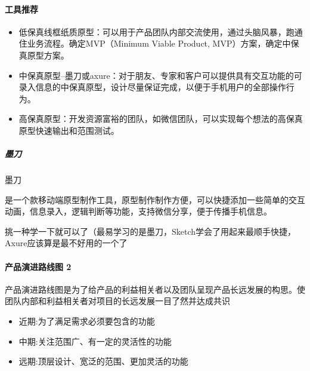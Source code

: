 \documentclass[letterpaper,10pt,english]{sphinxmanual}
\begin{document}
\paragraph{工具推荐}
\label{\detokenize{chapter_knowledge/prototype_design:id13}}\begin{itemize}
\item {} 
低保真\sphinxhyphen{}线框\sphinxhyphen{}纸质原型：可以用于产品团队内部交流使用，通过头脑风暴，跑通住业务流程。确定MVP（Minimum
Viable Product, MVP）方案，确定中保真原型方案。

\item {} 
中保真原型–墨刀或axure：对于朋友、专家和客户可以提供具有交互功能的可录入信息的中保真原型，设计尽量保证完成，以便于手机用户的全部操作行为。

\item {} 
高保真原型：开发资源富裕的团队，如微信团队，可以实现每个想法的高保真原型快速输出和范围测试。

\end{itemize}


\subparagraph{墨刀}
\label{\detokenize{chapter_knowledge/prototype_design:id14}}
墨刀%
\begin{footnote}[615]\sphinxAtStartFootnote
{}
%
\end{footnote}是一个款移动端原型制作工具，原型制作制作方便，可以快捷添加一些简单的交互动画，信息录入，逻辑判断等功能，支持微信分享，便于传播手机信息。

挑一种学一下就可以了（最易学习的是墨刀，Sketch学会了用起来最顺手快捷，Axure应该算是最不好用的一个了


\paragraph{产品演进路线图 2\sphinxfootnotemark[616]}
\label{\detokenize{chapter_knowledge/prototype_design:id15}}%
\begin{footnotetext}[616]\sphinxAtStartFootnote
{}
%
\end{footnotetext}\ignorespaces 
产品演进路线图是为了给产品的利益相关者以及团队呈现产品长远发展的构思。使团队内部和利益相关者对项目的长远发展一目了然并达成共识
\begin{itemize}
\item {} 
近期:为了满足需求必须要包含的功能

\item {} 
中期:关注范围广、有一定的灵活性的功能

\item {} 
远期:顶层设计、宽泛的范围、更加灵活的功能

\end{itemize}
\end{document}
